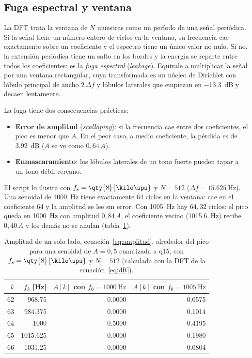 \documentclass[11pt,a4paper]{article}
\begin{document}
\subsection{Fuga espectral y ventana}\label{sec:fuga}

La DFT trata la ventana de $N$ muestras como un período de una señal
periódica. Si la señal tiene un número entero de ciclos en la ventana, su
frecuencia cae exactamente sobre un coeficiente y el espectro tiene un único
valor no nulo. Si no, la extensión periódica tiene un salto en los bordes y
la energía se reparte entre todos los coeficientes: es la \emph{fuga
espectral} (\emph{leakage}). Equivale a multiplicar la señal por una
ventana rectangular, cuya transformada es un núcleo de Dirichlet con lóbulo
principal de ancho $2\,\Delta f$ y lóbulos laterales que empiezan en
\qty{-13.3}{\deci\bel} y decaen lentamente.

La fuga tiene dos consecuencias prácticas:
\begin{itemize}[nosep]
  \item \textbf{Error de amplitud} (\emph{scalloping}): si la frecuencia cae
        entre dos coeficientes, el pico es menor que $A$. En el peor caso,
        a medio coeficiente, la pérdida es de \qty{3.92}{\deci\bel}
        ($A$ se ve como $0{,}64\,A$).
  \item \textbf{Enmascaramiento}: los lóbulos laterales de un tono fuerte
        pueden tapar a un tono débil cercano.
\end{itemize}

El script  lo ilustra con $f_s =
\qty{8}{\kilo\sps}$ y $N = 512$ ($\Delta f = \qty{15.625}{\hertz}$). Una
senoidal de \qty{1000}{\hertz} tiene exactamente 64 ciclos en la ventana:
cae en el coeficiente 64 y la amplitud se lee sin error. Con
\qty{1005}{\hertz} hay $64{,}32$ ciclos: el pico queda en
\qty{1000}{\hertz} con amplitud $0{,}84\,A$, el coeficiente vecino
(\qty{1015.6}{\hertz}) recibe $0{,}40\,A$ y los demás no se anulan
(tabla~\ref{tab:fuga}).

\begin{table}[H]
\centering
\caption{Amplitud de un solo lado, ecuación~\eqref{eq:amplitud}, alrededor
del pico para una senoidal de $A = 0{,}5$ cuantizada a q15, con $f_s =
\qty{8}{\kilo\sps}$ y $N = 512$ (calculada con la DFT de la
ecuación~\eqref{eq:dft}).}
\label{tab:fuga}
\begin{tabular}{@{}r r r r@{}}
\toprule
\textbf{$k$} & \textbf{$f_k$ [Hz]} & \textbf{$A[k]$ con $f_0 = \qty{1000}{\hertz}$} &
\textbf{$A[k]$ con $f_0 = \qty{1005}{\hertz}$}\\
\midrule
62 & \num{968.75}   & \num{0.0000} & \num{0.0575}\\
63 & \num{984.375}  & \num{0.0000} & \num{0.1014}\\
64 & \num{1000}     & \num{0.5000} & \num{0.4195}\\
65 & \num{1015.625} & \num{0.0000} & \num{0.1980}\\
66 & \num{1031.25}  & \num{0.0000} & \num{0.0804}\\
\bottomrule
\end{tabular}
\end{table}
\end{document}
